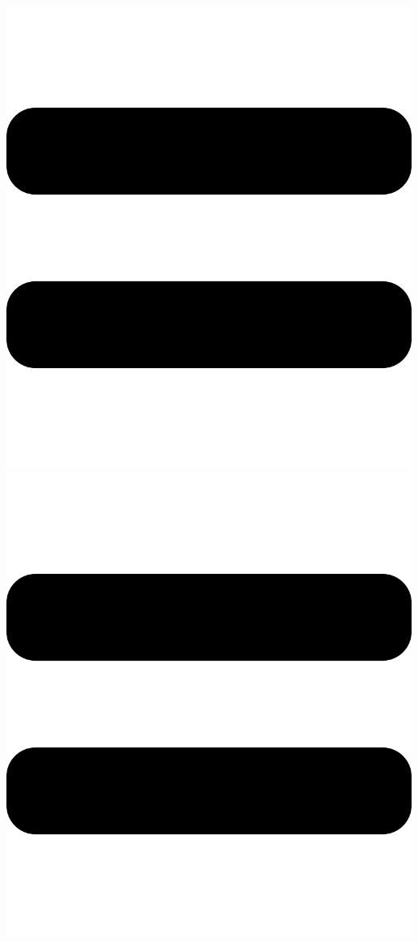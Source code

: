 \documentclass[11pt, a5paper]{article}
\begin{document}
	\begin{minipage}{\textwidth}
		\vspace{-0.75cm}
		\hspace{1cm}\includegraphics[scale=0.01]{eq} \hspace{5.3cm}
		\includegraphics[scale=0.01]{eq}
	\end{minipage}
\end{document}

